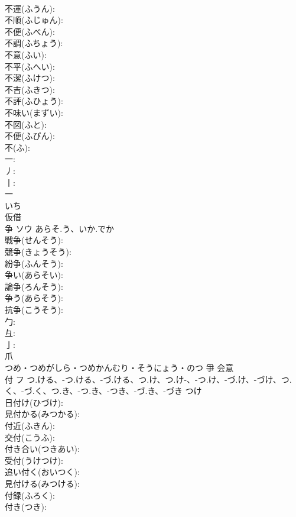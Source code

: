 \documentclass[8pt]{extreport}
\begin{document}
\begin{CJK}{UTF8}{min}
\\	不運(ふうん): 
\\	不順(ふじゅん): 
\\	不便(ふべん): 
\\	不調(ふちょう): 
\\	不意(ふい): 
\\	不平(ふへい): 
\\	不潔(ふけつ): 
\\	不吉(ふきつ): 
\\	不評(ふひょう): 
\\	不味い(まずい): 
\\	不図(ふと): 
\\	不便(ふびん): 
\\	不(ふ): 
\\	一: 
\\	丿: 
\\	丨: 
\\	一	
\\	いち	
\\	仮借 
\\	争	ソウ	あらそ.う、いか.でか		
\\	戦争(せんそう): 
\\	競争(きょうそう): 
\\	紛争(ふんそう): 
\\	争い(あらそい): 
\\	論争(ろんそう): 
\\	争う(あらそう): 
\\	抗争(こうそう): 
\\	勹: 
\\	彑: 
\\	亅: 
\\	爪	
\\	つめ・つめがしら・つめかんむり・そうにょう・のつ	爭	会意 
\\	付	フ	つ.ける、-つ.ける、-づ.ける、つ.け、つ.け-、-つ.け、-づ.け、-づけ、つ.く、-づ.く、つ.き、-つ.き、-つき、-づ.き、-づき	つけ	
\\	日付け(ひづけ): 
\\	見付かる(みつかる): 
\\	付近(ふきん): 
\\	交付(こうふ): 
\\	付き合い(つきあい): 
\\	受付(うけつけ): 
\\	追い付く(おいつく): 
\\	見付ける(みつける): 
\\	付録(ふろく): 
\\	付き(つき): 

\end{CJK}
\end{document}
